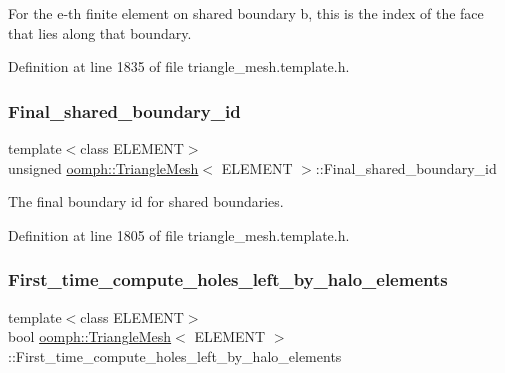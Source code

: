 For the e-\/th finite element on shared boundary b, this is the index of the face that lies along that boundary. 



Definition at line 1835 of file triangle\+\_\+mesh.\+template.\+h.

\mbox{\label{classoomph_1_1TriangleMesh_abb552c8115f5e4aea9138379a0523493}} 
\subsubsection{\texorpdfstring{Final\+\_\+shared\+\_\+boundary\+\_\+id}{Final\_shared\_boundary\_id}}
{\footnotesize\ttfamily template$<$class E\+L\+E\+M\+E\+NT$>$ \\
unsigned \hyperlink{classoomph_1_1TriangleMesh}{oomph\+::\+Triangle\+Mesh}$<$ E\+L\+E\+M\+E\+NT $>$\+::Final\+\_\+shared\+\_\+boundary\+\_\+id\hspace{0.3cm}{\ttfamily [protected]}}



The final boundary id for shared boundaries. 



Definition at line 1805 of file triangle\+\_\+mesh.\+template.\+h.

\mbox{\label{classoomph_1_1TriangleMesh_ab3953e0939e3fb86a1913faa4698d0b0}} 
\subsubsection{\texorpdfstring{First\+\_\+time\+\_\+compute\+\_\+holes\+\_\+left\+\_\+by\+\_\+halo\+\_\+elements}{First\_time\_compute\_holes\_left\_by\_halo\_elements}}
{\footnotesize\ttfamily template$<$class E\+L\+E\+M\+E\+NT$>$ \\
bool \hyperlink{classoomph_1_1TriangleMesh}{oomph\+::\+Triangle\+Mesh}$<$ E\+L\+E\+M\+E\+NT $>$\+::First\+\_\+time\+\_\+compute\+\_\+holes\+\_\+left\+\_\+by\+\_\+halo\+\_\+elements\hspace{0.3cm}{\ttfamily [protected]}}



